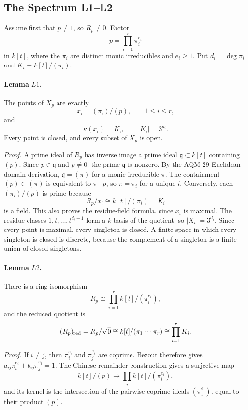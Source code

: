 \subsection{The Spectrum L1--L2}

Assume first that \(p\ne1\), so \(R_p\ne0\).  Factor
\[
  p=\prod_{i=1}^r\pi_i^{e_i}
\]
in \(k[t]\), where the \(\pi_i\) are distinct monic irreducibles and
\(e_i\ge1\).  Put \(d_i=\deg\pi_i\) and \(K_i=k[t]/(\pi_i)\).

\paragraph{Lemma \(L1\).}
The points of \(X_p\) are exactly
\[
  x_i=(\pi_i)/(p),\qquad 1\le i\le r,
\]
and
\[
  \kappa(x_i)=K_i,\qquad |K_i|=3^{d_i}.
\]
Every point is closed, and every subset of \(X_p\) is open.

\emph{Proof.}
A prime ideal of \(R_p\) has inverse image a prime ideal
\(\mathfrak q\subset k[t]\) containing \((p)\).  Since \(p\in\mathfrak q\)
and \(p\ne0\), the prime \(\mathfrak q\) is nonzero.  By the AQM-29
Euclidean-domain derivation, \(\mathfrak q=(\pi)\) for a monic irreducible
\(\pi\).  The containment \((p)\subset(\pi)\) is equivalent to \(\pi\mid p\),
so \(\pi=\pi_i\) for a unique \(i\).  Conversely, each \((\pi_i)/(p)\) is
prime because
\[
  R_p/x_i\cong k[t]/(\pi_i)=K_i
\]
is a field.  This also proves the residue-field formula, since \(x_i\) is
maximal.  The residue classes \(1,t,\ldots,t^{d_i-1}\) form a \(k\)-basis of
the quotient, so \(|K_i|=3^{d_i}\).  Since every point is maximal, every
singleton is closed.  A finite space in which every singleton is closed is
discrete, because the complement of a singleton is a finite union of closed
singletons.

\paragraph{Lemma \(L2\).}
There is a ring isomorphism
\[
  R_p\cong\prod_{i=1}^r k[t]/(\pi_i^{e_i}),
\]
and the reduced quotient is
\[
  (R_p)_{\rm red}=R_p/\sqrt0
  \cong k[t]/(\pi_1\cdots\pi_r)
  \cong\prod_{i=1}^r K_i.
\]

\emph{Proof.}
If \(i\ne j\), then \(\pi_i^{e_i}\) and \(\pi_j^{e_j}\) are coprime.  Bezout
therefore gives \(a_{ij}\pi_i^{e_i}+b_{ij}\pi_j^{e_j}=1\).  The Chinese
remainder construction gives a surjective map
\[
  k[t]/(p)\longrightarrow\prod_i k[t]/(\pi_i^{e_i}),
\]
and its kernel is the intersection of the pairwise coprime ideals
\((\pi_i^{e_i})\), equal to their product \((p)\).

